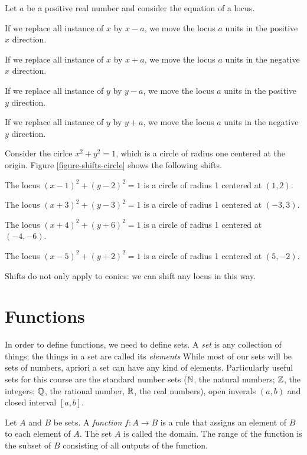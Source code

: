 \documentclass[fleqn]{report}
\begin{document}
Let $a$ be a positive real number and consider the equation of
a locus.
\begin{smallitemize}
\item If we replace all instance of $x$ by $x-a$, we move the
locus $a$ units in the positive $x$ direction.
\item If we replace all instance of $x$ by $x+a$, we move the
locus $a$ units in the negative $x$ direction.
\item If we replace all instance of $y$ by $y-a$, we move the
locus $a$ units in the positive $y$ direction.
\item If we replace all instance of $y$ by $y+a$, we move the
locus $a$ units in the negative $y$ direction.
\end{smallitemize}
Consider the cirlce $x^2 + y^2 = 1$, which is a circle of
radius one centered at the origin. Figure \ref{figure-shifts-circle}
shows the following shifts.
\begin{smallitemize}
\item The locus $(x-1)^2 + (y-2)^2 = 1$ is a circle of radius
1 centered at $(1,2)$.
\item The locus $(x+3)^2 + (y-3)^2 = 1$ is a circle of radius
1 centered at $(-3,3)$.
\item The locus $(x+4)^2 + (y+6)^2 = 1$ is a circle of radius
1 centered at $(-4,-6)$.
\item The locus $(x-5)^2 + (y+2)^2 = 1$ is a circle of radius
1 centered at $(5,-2)$.
\end{smallitemize}
Shifts do not only apply to conics: we can shift any locus in
this way.

\section{Functions}
\label{functions}

In order to define functions, we need to define sets. A
\emph{set} is any collection of things; the things in a set
are called its \emph{elements} While most of our sets will be
sets of numbers, apriori a set can have any kind of elements. 
Particularly useful sets for this course are the standard
number sets ($\mathbb{N}$, the natural numbers; $\mathbb{Z}$, the integers;
$\mathbb{Q}$, the rational number, $\mathbb{R}$, the real numbers), open
inverals $(a,b)$ and closed interval $[a,b]$.

Let $A$ and $B$ be sets. 
A \emph{function} $f: A \rightarrow B$ is a rule that assigns an
element of $B$ to each element of $A$. The set $A$ is called
the domain. The range of the function is the subset of $B$
consisting of all outputs of the function.
\end{document}
